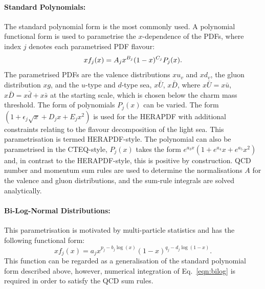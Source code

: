 \paragraph{Standard Polynomials:} 
The standard polynomial form is the most commonly used. A polynomial functional form is used to parametrise the $x$-dependence of the PDFs, where index $j$ denotes each parametrised PDF flavour:
\begin{equation}
\centering
 xf_j(x) = A_j x^{B_j} (1-x)^{C_j} P_j(x).
\label{eqn:pdf_std}
\end{equation}
The parametrised PDFs are the valence distributions
$xu_v$ and $xd_v$, the gluon distribution $xg$, and the $u$-type and $d$-type sea,
$x\bar{U}$, $x\bar{D}$, where $x\bar{U} = x\bar{u}$, 
$x\bar{D} = x\bar{d} +x\bar{s}$ at the starting scale, which is 
chosen below the charm mass threshold. 
The form of polynomials $P_j(x)$ can be varied.
The form $(1 + \epsilon_j \sqrt{x} + D_j x + E_j x^2)$
is used for the HERAPDF \cite{h1zeus:2009wt} 
with additional constraints relating to the flavour decomposition of the 
light sea. This parametrisation is termed HERAPDF-style. The polynomial can also
be parametrised in the CTEQ-style, $P_j(x)$ takes the form $e^{a_3x} (1 + e^{a_4} x + e^{a_5} x^2)$ and,
in contrast to  the HERAPDF-style, this is positive by construction.
QCD number and momentum sum rules are used to determine the normalisations $A$ for the valence and gluon
distributions, and the sum-rule integrals are solved analytically.
\paragraph{Bi-Log-Normal Distributions:} 
This parametrisation is motivated by multi-particle statistics
and has the following functional form:
\begin{equation}
 xf_j(x)=a_j x^{p_j-b_j\log(x)}(1-x)^{q_j-d_j \log(1-x)}.
\label{eqn:bilog}
\end{equation}
This function can be regarded as a generalisation of the standard polynomial form described above,
however, numerical integration of Eq.~\ref{eqn:bilog} is required in order to satisfy the QCD sum rules.
